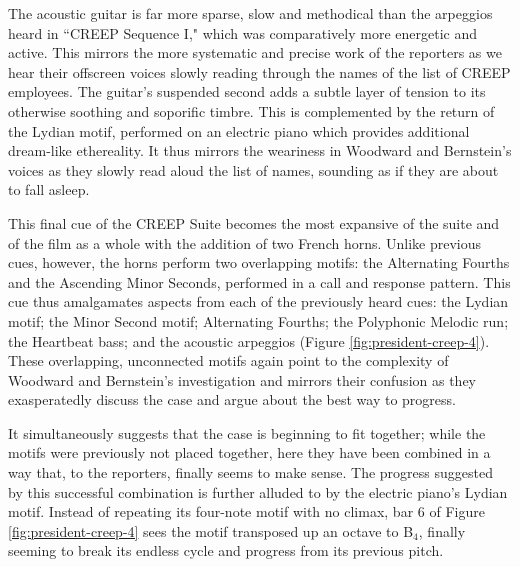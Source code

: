The acoustic guitar is far more sparse, slow and methodical than the arpeggios heard in ``CREEP Sequence I," which was comparatively more energetic and active.
This mirrors the more systematic and precise work of the reporters as we hear their offscreen voices slowly reading through the names of the list of CREEP employees.
The guitar's suspended second adds a subtle layer of tension to its otherwise soothing and soporific timbre.
This is complemented by the return of the Lydian motif, performed on an electric piano which provides additional dream-like ethereality.
It thus mirrors the weariness in Woodward and Bernstein's voices as they slowly read aloud the list of names, sounding as if they are about to fall asleep.

This final cue of the CREEP Suite becomes the most expansive of the suite and of the film as a whole with the addition of two French horns.
Unlike previous cues, however, the horns perform two overlapping motifs: the Alternating Fourths and the Ascending Minor Seconds, performed in a call and response pattern.
This cue thus amalgamates aspects from each of the previously heard cues: the Lydian motif; the Minor Second motif; Alternating Fourths; the Polyphonic Melodic run; the Heartbeat bass; and the acoustic arpeggios (Figure \ref{fig:president-creep-4}).
These overlapping, unconnected motifs again point to the complexity of Woodward and Bernstein’s investigation and mirrors their confusion as they exasperatedly discuss the case and argue about the best way to progress.

It simultaneously suggests that the case is beginning to fit together; while the motifs were previously not placed together, here they have been combined in a way that, to the reporters, finally seems to make sense. 
The progress suggested by this successful combination is further alluded to by the electric piano's Lydian motif.
Instead of repeating its four-note motif with no climax, bar 6 of Figure \ref{fig:president-creep-4} sees the motif transposed up an octave to B\flat$_4$, finally seeming to break its endless cycle and progress from its previous pitch.

